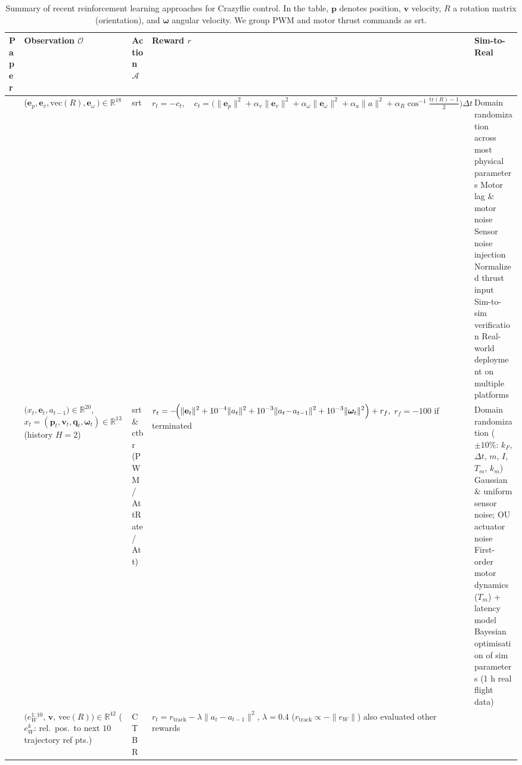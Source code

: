 \begin{table*}[!b]
  \centering
  \caption[Summary of RL approaches]{Summary of recent reinforcement learning approaches for Crazyflie control. In the table, $\mathbf{p}$ denotes position, $\mathbf{v}$ velocity, $R$ a rotation matrix (orientation), and $\boldsymbol{\omega}$ angular velocity. We group PWM and motor thrust commands as \gls{srt}.}
  \label{tab:rl_comparison}
  \scriptsize
  \begin{tabularx}{\textwidth}{p{0.7cm} p{3.0cm} p{1.3cm} p{3.5cm} X}
    \toprule
    \rowcolor{white}
    \textbf{Paper} & \textbf{Observation $\mathcal{O}$} & \textbf{Action $\mathcal{A}$} & \textbf{Reward $r$} & \textbf{Sim-to-Real} \\
    \midrule
    \cite{molchanov_sim--multi-real_2019} & 
    ($\mathbf e_p,\mathbf e_v,\mathrm{vec}(R),\mathbf e_\omega\,)\in\mathbb R^{18} $ & 
    \gls{srt}  & 
      \(\displaystyle
    r_t=-c_t,\quad
    c_t=\bigl(\|\mathbf e_p\|^2+\alpha_v\|\mathbf e_v\|^2+\alpha_\omega\|\mathbf e_\omega\|^2+\alpha_a\|a\|^2+\alpha_R\cos^{-1}\!\tfrac{\mathrm{tr}(R)-1}{2}\bigr)\Delta t
    \) 
    &
     Domain randomization across most physical parameters\newline
      Motor lag \& motor noise\newline
      Sensor noise injection\newline
      Normalized thrust input\newline
      Sim-to-sim verification\newline
      Real-world deployment on multiple platforms  \\
    \cite{gronauer_using_2022} & 
    $\bigl(x_t,\mathbf{e}_t,a_{t-1}\bigr)\!\in\!\mathbb{R}^{20}$, \newline 
    $x_t=(\mathbf{p}_t,\mathbf{v}_t,\mathbf{q}_t,\boldsymbol{\omega}_t)\!\in\!\mathbb{R}^{13}$ \newline 
    (history $H{=}2$) & 
    \gls{srt} \& \gls{ctbr}\newline 
    (PWM / AttRate / Att) & 
    $\displaystyle r_t= -\!\Bigl(\|\mathbf{e}_t\|^{2} + 10^{-4}\|a_t\|^{2} + 10^{-3}\|a_t\!-\!a_{t-1}\|^{2} + 10^{-3}\|\boldsymbol{\omega}_t\|^{2}\Bigr) + r_f,$ \newline 
    $r_f = -100$ if terminated &
    Domain randomization ($\pm10\%$: $k_F$, $\Delta t$, $m$, $I$, $T_m$, $k_m$) \newline
    Gaussian \& uniform sensor noise; OU actuator noise \newline
    First-order motor dynamics ($T_m$) + latency model \newline
    Bayesian optimisation of sim parameters (1 h real flight data)\\
    \cite{chen_what_2024} & 
    $\bigl(e_W^{1:10},\,\mathbf v,\,\mathrm{vec}(R)\bigr)\!\in\!\mathbb R^{42}$
    ($e_W^{k}$: rel.\ pos.\ to next $10$ trajectory ref pts.) & 
    CTBR & 
    $r_t = r_{\text{track}} - \lambda\|a_t - a_{t-1}\|^2$, \; $\lambda=0.4$ \newline 
    ($r_{\text{track}} \propto -\|e_W\|$) \newline
    also evaluated other rewards
    & 
   

\end{tabularx}
\end{table*}
